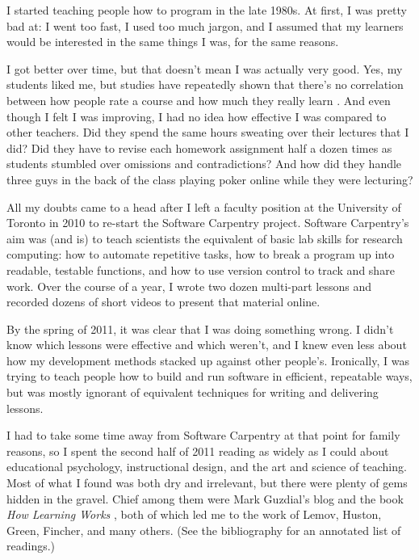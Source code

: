 
I started teaching people how to program in the late 1980s.  At first,
I was pretty bad at: I went too fast, I used too much jargon, and I
assumed that my learners would be interested in the same things I was,
for the same reasons.

I got better over time, but that doesn't mean I was actually very
good.  Yes, my students liked me, but studies have repeatedly shown
that there's no correlation between how people rate a course and how
much they really learn \cite{fixme}.  And even though I felt I was
improving, I had no idea how effective I was compared to other
teachers.  Did they spend the same hours sweating over their lectures
that I did?  Did they have to revise each homework assignment half a
dozen times as students stumbled over omissions and contradictions?
And how did they handle three guys in the back of the class playing
poker online while they were lecturing?

All my doubts came to a head after I left a faculty position at the
University of Toronto in 2010 to re-start the Software Carpentry
project.  Software Carpentry's aim was (and is) to teach scientists
the equivalent of basic lab skills for research computing: how to
automate repetitive tasks, how to break a program up into readable,
testable functions, and how to use version control to track and share
work.  Over the course of a year, I wrote two dozen multi-part lessons
and recorded dozens of short videos to present that material online.

By the spring of 2011, it was clear that I was doing something wrong.
I didn't know which lessons were effective and which weren't, and I
knew even less about how my development methods stacked up against
other people's.  Ironically, I was trying to teach people how to build
and run software in efficient, repeatable ways, but was mostly ignorant of
equivalent techniques for writing and delivering lessons.

I had to take some time away from Software Carpentry at that point for
family reasons, so I spent the second half of 2011 reading as widely
as I could about educational psychology, instructional design, and the
art and science of teaching.  Most of what I found was both dry and
irrelevant, but there were plenty of gems hidden in the gravel.  Chief
among them were Mark Guzdial's blog \cite{fixme} and the
book \emph{How Learning Works} \cite{fixme}, both of which led me to
the work of Lemov, Huston, Green, Fincher, and many others.  (See the
bibliography for an annotated list of readings.)

